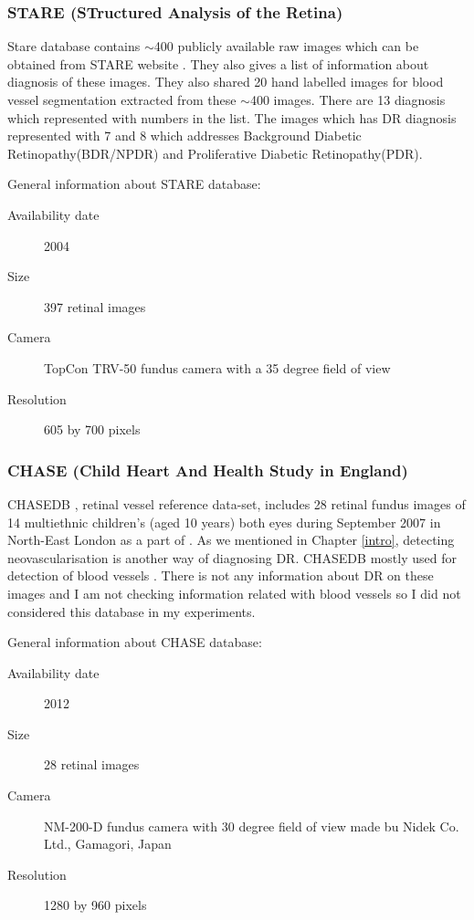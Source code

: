 \subsubsection{STARE (STructured Analysis of the Retina)}
Stare database contains $\sim$400 publicly available raw images which can be obtained from STARE website \citep{STARE}. They also gives a list of information about diagnosis of these images. They also shared 20 hand labelled images for blood vessel segmentation \citep{hoover2000locating} extracted from these $\sim$400 images. There are 13 diagnosis which represented with numbers in the list. The images which has DR diagnosis represented with 7 and 8 which addresses Background Diabetic Retinopathy(BDR/NPDR) and Proliferative Diabetic Retinopathy(PDR).

General information about STARE database:

\begin{description}
    \item[Availability date] 2004
    \item[Size] 397 retinal images
    \item[Camera] TopCon TRV-50 fundus camera with a 35 degree field of view
    \item[Resolution] 605 by 700 pixels
\end{description}

\subsubsection{CHASE (Child Heart And Health Study in England)}

CHASEDB \citep{Retinal-image-database}, retinal vessel reference data-set, includes 28 retinal fundus images of 14 multiethnic children's (aged 10 years) both eyes during September 2007 in North-East London as a part of \citet{fraz2012ensemble}. As we mentioned in Chapter \ref{intro}, detecting neovascularisation is another way of diagnosing DR. CHASEDB mostly used for detection of blood vessels \citep{liskowski2016segmenting} \citep{elbalaoui2016automatic}. There is not any information about DR on these images and I am not checking information related with blood vessels so I did not considered this database in my experiments.

General information about CHASE database:
\begin{description}
    \item[Availability date] 2012
    \item[Size] 28 retinal images
    \item[Camera] NM-200-D fundus camera with 30 degree field of view made bu Nidek Co. Ltd., Gamagori, Japan
    \item[Resolution] 1280 by 960 pixels
\end{description}

